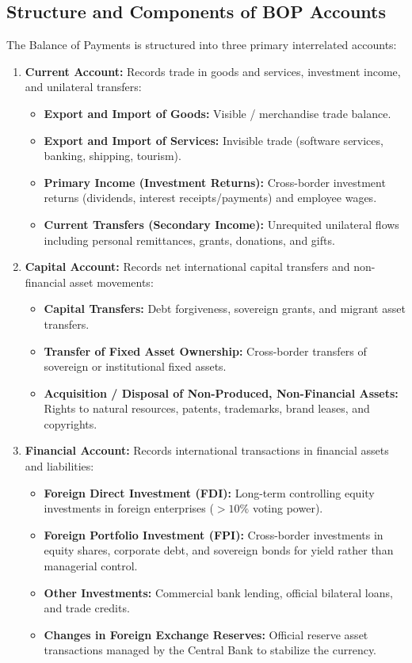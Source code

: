 \subsection{Structure and Components of BOP Accounts}
The Balance of Payments is structured into three primary interrelated accounts:
\begin{enumerate}[leftmargin=*]
    \item \textbf{Current Account:} Records trade in goods and services, investment income, and unilateral transfers:
    \begin{itemize}[noitemsep]
        \item \textbf{Export and Import of Goods:} Visible / merchandise trade balance.
        \item \textbf{Export and Import of Services:} Invisible trade (software services, banking, shipping, tourism).
        \item \textbf{Primary Income (Investment Returns):} Cross-border investment returns (dividends, interest receipts/payments) and employee wages.
        \item \textbf{Current Transfers (Secondary Income):} Unrequited unilateral flows including personal remittances, grants, donations, and gifts.
    \end{itemize}

    \item \textbf{Capital Account:} Records net international capital transfers and non-financial asset movements:
    \begin{itemize}[noitemsep]
        \item \textbf{Capital Transfers:} Debt forgiveness, sovereign grants, and migrant asset transfers.
        \item \textbf{Transfer of Fixed Asset Ownership:} Cross-border transfers of sovereign or institutional fixed assets.
        \item \textbf{Acquisition / Disposal of Non-Produced, Non-Financial Assets:} Rights to natural resources, patents, trademarks, brand leases, and copyrights.
    \end{itemize}

    \item \textbf{Financial Account:} Records international transactions in financial assets and liabilities:
    \begin{itemize}[noitemsep]
        \item \textbf{Foreign Direct Investment (FDI):} Long-term controlling equity investments in foreign enterprises ($>10\%$ voting power).
        \item \textbf{Foreign Portfolio Investment (FPI):} Cross-border investments in equity shares, corporate debt, and sovereign bonds for yield rather than managerial control.
        \item \textbf{Other Investments:} Commercial bank lending, official bilateral loans, and trade credits.
        \item \textbf{Changes in Foreign Exchange Reserves:} Official reserve asset transactions managed by the Central Bank to stabilize the currency.
    \end{itemize}
\end{enumerate}

